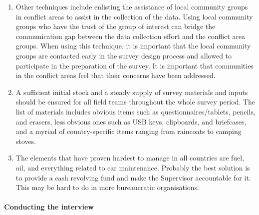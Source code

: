 \documentclass[
]{article}
\begin{document}
\begin{enumerate}
\item
  Other techniques include enlisting the assistance of local
  community groups in conflict areas to assist in the collection of
  the data. Using local community groups who have the trust of the
  group of interest can bridge the communication gap between the data
  collection effort and the conflict area groups. When using this
  technique, it is important that the local community groups are
  contacted early in the survey design process and allowed to
  participate in the preparation of the survey. It is important that
  communities in the conflict areas feel that their concerns have been
  addressed.
\item
  A sufficient initial stock and a steady supply of survey materials
  and inputs should be ensured for all field teams throughout the
  whole survey period. The list of materials includes obvious items
  such as questionnaires/tablets, pencils, and erasers, less obvious
  ones such as USB keys, clipboards, and briefcases, and a myriad of
  country-specific items ranging from raincoats to camping stoves.
\item
  The elements that have proven hardest to manage in all countries
  are fuel, oil, and everything related to car maintenance. Probably
  the best solution is to provide a cash revolving fund and make the
  Supervisor accountable for it. This may be hard to do in more
  bureaucratic organisations.
\end{enumerate}

\hypertarget{conducting-the-interview}{%
\paragraph{Conducting the interview}\label{conducting-the-interview}}
\end{document}
